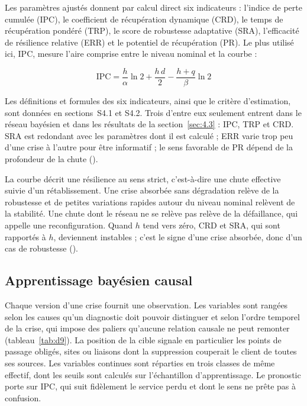 Les paramètres ajustés donnent par calcul direct six indicateurs : l'indice de perte cumulée (IPC), le coefficient de récupération dynamique (CRD), le temps de récupération pondéré (TRP), le score de robustesse adaptative (SRA), l'efficacité de résilience relative (ERR) et le potentiel de récupération (PR). Le plus utilisé ici, IPC, mesure l'aire comprise entre le niveau nominal et la courbe :

\begin{equation}
\mathrm{IPC} = \frac{h}{\alpha}\ln 2 + \frac{h\,d}{2} - \frac{h + q}{\beta}\ln 2
\label{eq:7}
\end{equation}

Les définitions et formules des six indicateurs, ainsi que le critère d'estimation, sont données en sections~S4.1 et S4.2. Trois d'entre eux seulement entrent dans le réseau bayésien et dans les résultats de la section~\ref{sec:4.3} : IPC, TRP et CRD. SRA est redondant avec les paramètres dont il est calculé ; ERR varie trop peu d'une crise à l'autre pour être informatif ; le sens favorable de PR dépend de la profondeur de la chute ().

La courbe décrit une résilience au sens strict, c'est-à-dire une chute effective suivie d'un rétablissement. Une crise absorbée sans dégradation relève de la robustesse et de petites variations rapides autour du niveau nominal relèvent de la stabilité. Une chute dont le réseau ne se relève pas relève de la défaillance, qui appelle une reconfiguration. Quand $h$ tend vers zéro, CRD et SRA, qui sont rapportés à $h$, deviennent instables ; c'est le signe d'une crise absorbée, donc d'un cas de robustesse ().

\subsection{Apprentissage bayésien causal}
\label{sec:3.4}

Chaque version d'une crise fournit une observation. Les variables sont rangées selon les causes qu'un diagnostic doit pouvoir distinguer et selon l'ordre temporel de la crise, qui impose des paliers qu'aucune relation causale ne peut remonter (tableau~\ref{tab:d9}). La position de la cible signale en particulier les points de passage obligés, sites ou liaisons dont la suppression couperait le client de toutes ses sources. Les variables continues sont réparties en trois classes de même effectif, dont les seuils sont calculés sur l'échantillon d'apprentissage. Le pronostic porte sur IPC, qui suit fidèlement le service perdu et dont le sens ne prête pas à confusion.

